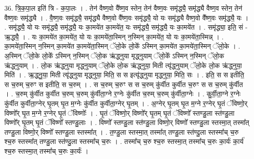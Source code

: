 \documentclass[17pt]{extarticle}
\begin{document}
36. त्रि॒क॒पा॒ल इति॑ त्रि - क॒पा॒लः । . तेन॑ वैष्ण॒वो वै᳚ष्ण॒व स्तेन॒ तेन॑ वैष्ण॒वः समृ॑द्ध्यै॒ समृ॑द्ध्यै वैष्ण॒व स्तेन॒ तेन॑ वैष्ण॒वः समृ॑द्ध्यै । . वै॒ष्ण॒वः समृ॑द्ध्यै॒ समृ॑द्ध्यै वैष्ण॒वो वै᳚ष्ण॒वः समृ॑द्ध्यै॒ यो यः समृ॑द्ध्यै वैष्ण॒वो वै᳚ष्ण॒वः समृ॑द्ध्यै॒ यः । . समृ॑द्ध्यै॒ यो यः समृ॑द्ध्यै॒ समृ॑द्ध्यै॒ यः का॒मये॑त का॒मये॑त॒ यः समृ॑द्ध्यै॒ समृ॑द्ध्यै॒ यः का॒मये॑त । . समृ॑द्ध्या॒ इति॒ सं - ऋ॒द्ध्यै॒ । . यः का॒मये॑त का॒मये॑त॒ यो यः का॒मये॑ता॒स्मिन् न॒स्मिन् का॒मये॑त॒ यो यः का॒मये॑ता॒स्मिन्न् । . का॒मये॑ता॒स्मिन् न॒स्मिन् का॒मये॑त का॒मये॑ता॒स्मिन् ॅलो॒के लो॒के᳚ ऽस्मिन् का॒मये॑त का॒मये॑ता॒स्मिन् ॅलो॒के । . अ॒स्मिन् ॅलो॒के लो॒के᳚ ऽस्मिन् न॒स्मिन् ॅलो॒क ऋ॑द्ध्नुया मृद्ध्नुयाम् ॅलो॒के᳚ ऽस्मिन् न॒स्मिन् ॅलो॒क ऋ॑द्ध्नुयाम् । . लो॒क ऋ॑द्ध्नुया मृद्ध्नुयाम् ॅलो॒के लो॒क ऋ॑द्ध्नुया॒ मिती त्यृ॑द्ध्नुयाम् ॅलो॒के लो॒क ऋ॑द्ध्नुया॒ मिति॑ । . ऋ॒द्ध्नु॒या॒ मिती त्यृ॑द्ध्नुया मृद्ध्नुया॒ मिति॒ स स इत्यृ॑द्ध्नुया मृद्ध्नुया॒ मिति॒ सः । . इति॒ स स इतीति॒ स च॒रुम् च॒रुꣳ स इतीति॒ स च॒रुम् । . स च॒रुम् च॒रुꣳ स स च॒रुम् कु॑र्वीत कुर्वीत च॒रुꣳ स स च॒रुम् कु॑र्वीत । . च॒रुम् कु॑र्वीत कुर्वीत च॒रुम् च॒रुम् कु॑र्वीता॒ग्ने र॒ग्नेः कु॑र्वीत च॒रुम् च॒रुम् कु॑र्वीता॒ग्नेः । . कु॒र्वी॒ता॒ग्ने र॒ग्नेः कु॑र्वीत कुर्वीता॒ग्नेर् घृ॒तम् घृ॒त म॒ग्नेः कु॑र्वीत कुर्वीता॒ग्नेर् घृ॒तम् । . अ॒ग्नेर् घृ॒तम् घृ॒त म॒ग्ने र॒ग्नेर् घृ॒तं ॅविष्णो॒र् विष्णो᳚र् घृ॒त म॒ग्ने र॒ग्नेर् घृ॒तं ॅविष्णोः᳚ । . घृ॒तं ॅविष्णो॒र् विष्णो᳚र् घृ॒तम् घृ॒तं ॅविष्णो᳚ स्तण्डु॒ला स्त॑ण्डु॒ला विष्णो᳚र् घृ॒तम् घृ॒तं ॅविष्णो᳚ स्तण्डु॒लाः । . विष्णो᳚ स्तण्डु॒ला स्त॑ण्डु॒ला विष्णो॒र् विष्णो᳚ स्तण्डु॒ला स्तस्मा॒त् तस्मा᳚त् तण्डु॒ला विष्णो॒र् विष्णो᳚ स्तण्डु॒ला स्तस्मा᳚त् । . त॒ण्डु॒ला स्तस्मा॒त् तस्मा᳚त् तण्डु॒ला स्त॑ण्दु॒ला स्तस्मा᳚च् च॒रु श्च॒रु स्तस्मा᳚त् तण्डु॒ला स्त॑ण्दु॒ला स्तस्मा᳚च् च॒रुः । . तस्मा᳚च् च॒रु श्च॒रु स्तस्मा॒त् तस्मा᳚च् च॒रुः का॒र्यः॑ का॒र्य॑ श्च॒रु स्तस्मा॒त् तस्मा᳚च् च॒रुः का॒र्यः॑ । \newline
\pagebreak
{}
\end{document}
